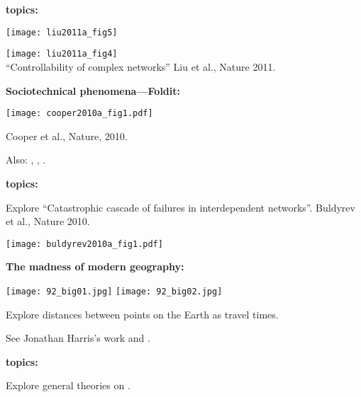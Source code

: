   \textbf{topics:}

  
          
      
      \texttt{[image: liu2011a\_fig5]}
      
      \texttt{[image: liu2011a\_fig4]}\\
      ``Controllability of complex networks''\cite{liu2011a}
      Liu et al., Nature 2011.
      
      



  \textbf{Sociotechnical phenomena---Foldit:}

  
  \texttt{[image: cooper2010a\_fig1.pdf]}
  
   
    Cooper et al., Nature, 2010.\cite{cooper2010a}
   
    Also: , 
    ,
    .
  
  



  \textbf{topics:}

  
  Explore ``Catastrophic cascade of failures in interdependent networks''\cite{buldyrev2010a}.
  Buldyrev et al., Nature 2010.

  \texttt{[image: buldyrev2010a\_fig1.pdf]}
  



  \textbf{The madness of modern geography:}

  
    \texttt{[image: 92\_big01.jpg]}
    \texttt{[image: 92\_big02.jpg]}
    
    
      Explore distances between points on the Earth 
      as travel times.
    
      See Jonathan Harris's work 
      and
      .
    
  



  \textbf{topics:}

  
  
   
    Explore general theories on .
  
